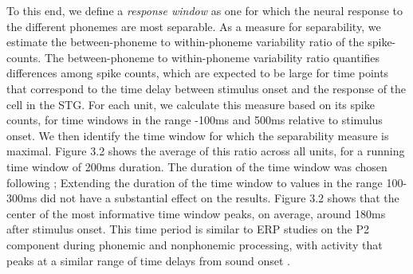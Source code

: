 To this end, we define a {\it response window} as one for which the neural response to the different phonemes are most separable. As a measure for separability, we estimate the between-phoneme to within-phoneme variability ratio of the spike-counts. The between-phoneme to within-phoneme variability ratio quantifies differences among spike counts, which are expected to be large for time points that correspond to the time delay between stimulus onset and the response of the cell in the STG. For each unit, we calculate this measure based on its spike counts, for time windows in the range -100ms and 500ms relative to stimulus onset. We then identify the time window for which the separability measure is maximal. Figure 3.2 shows the average of this ratio across all units, for a running time window of 200ms duration. The duration of the time window was chosen following \citealp{chan2013speech}; Extending the duration of the time window to values in the range 100-300ms did not have a substantial effect on the results. Figure 3.2 shows that the center of the most informative time window peaks, on average, around 180ms after stimulus onset. This time period is similar to ERP studies on the P2 component during phonemic and nonphonemic processing, with activity that peaks at a similar range of time delays from sound onset \citep{verkindt1994two, liebenthal2010specialization}.


